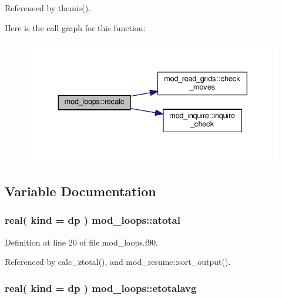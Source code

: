 Referenced by themis().



Here is the call graph for this function\+:\nopagebreak
\begin{figure}[H]
\begin{center}
\leavevmode
\includegraphics[width=330pt]{namespacemod__loops_a755c1c6e9232a99181d4ac9a7c0c5cff_cgraph}
\end{center}
\end{figure}




\subsection{Variable Documentation}
\subsubsection[{\texorpdfstring{atotal}{atotal}}]{\setlength{\rightskip}{0pt plus 5cm}real( kind = dp ) mod\+\_\+loops\+::atotal}\hypertarget{namespacemod__loops_a16597662d980828d74a9078f4b74e677}{}\label{namespacemod__loops_a16597662d980828d74a9078f4b74e677}


Definition at line 20 of file mod\+\_\+loops.\+f90.



Referenced by calc\+\_\+ztotal(), and mod\+\_\+resume\+::sort\+\_\+output().

\subsubsection[{\texorpdfstring{etotalavg}{etotalavg}}]{\setlength{\rightskip}{0pt plus 5cm}real( kind = dp ) mod\+\_\+loops\+::etotalavg}\hypertarget{namespacemod__loops_ad69a647146ed54f5c84b96e742396716}{}\label{namespacemod__loops_ad69a647146ed54f5c84b96e742396716}


